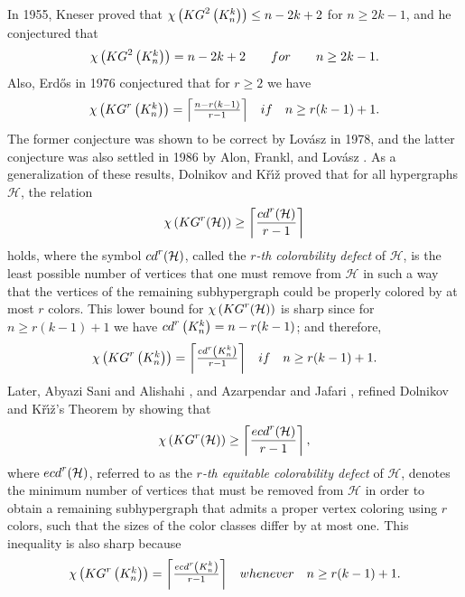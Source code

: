 \documentclass[11pt]{amsart}
\theoremstyle{definition}
\begin{document}
\noindent In 1955, Kneser \cite{MR0068536} proved that $\chi\left({\rm KG}^2 \left(  K_n^k \right) \right) \leq n-2k+2$ for $n\geq 2k-1$, and he conjectured that 
$$\begin{array}{lcccr}
	\chi\left({\rm KG}^2 \left(  K_n^k \right) \right) = n-2k+2  &    &  {\rm for }  &   &   n\geq 2k-1 .
\end{array}$$
Also, Erd\H{o}s
\cite{MR0465878} in 1976 conjectured that for $r\geq 2$ we have
$$\begin{array}{lrr}
	\chi\left({\rm KG}^r \left(  K_n^k \right) \right) = \left\lceil \frac{n-r(k-1)}{r-1} \right\rceil &  {\rm if }  &  n \geq r(k-1) + 1 .
\end{array}$$
The former conjecture was shown to be correct by Lov{\'a}sz \cite{MR514625} in 1978, and the latter conjecture was also settled in 1986
by Alon, Frankl, and Lov{\'a}sz \cite{MR857448}.
As a generalization of these results, Dol{\cprime}nikov and K{\v{r}}{\'{\i}}{\v{z}} \cite{MR953021,MR1081939,MR1665335}
proved that for all hypergraphs ${\mathcal H}$, the relation
$$\chi\left({\rm KG}^r   ({\mathcal H})  \right) \geq \left\lceil \frac{ {\rm cd}^r({\mathcal H}) }{r-1} \right\rceil $$
holds, where the symbol ${\rm cd}^r({\mathcal H})$, called the {\it $r$-th colorability defect} of ${\mathcal H}$, is the least possible number of vertices that one must remove from
${\mathcal H}$ in such a way that the vertices of the remaining subhypergraph could be properly colored by at most $r$ colors. This lower bound for
$\chi\left({\rm KG}^r   ({\mathcal H})  \right) $ is sharp since for
$n \geq r(k-1) + 1$ we have
${\rm cd}^r \left(  K_n^k \right) = n-r(k-1)$; and therefore,
$$\begin{array}{lrr}
	\chi\left({\rm KG}^r \left(  K_n^k \right) \right) = \left\lceil \frac{{\rm cd}^r \left(  K_n^k \right)}{r-1} \right\rceil &  {\rm if }  &  n \geq r(k-1) + 1 .
\end{array}$$
Later, Abyazi Sani and Alishahi \cite{ABYAZISANI2018229}, and Azarpendar and Jafari \cite{AZARPENDAR2023103664},
refined Dol{\cprime}nikov and K{\v{r}}{\'{\i}}{\v{z}}'s Theorem by showing that
$$\chi\left({\rm KG}^r ({\mathcal H}) \right) \geq \left\lceil \frac{ {\rm ecd}^r({\mathcal H}) }{r-1} \right\rceil ,$$
where ${\rm ecd}^r({\mathcal H})$, referred to as the {\it $r$-th equitable colorability defect} of ${\mathcal H}$, denotes the minimum number of vertices that must be
removed from ${\mathcal H}$ in order to obtain a remaining subhypergraph that admits a proper vertex coloring using $r$ colors, such that the sizes of the color classes differ by at most one.
This inequality is also sharp because
$$\begin{array}{lrr}
	\chi\left({\rm KG}^r \left(  K_n^k \right) \right) = \left\lceil \frac{{\rm ecd}^r \left(  K_n^k \right)}{r-1} \right\rceil &  {\rm whenever }  &  n \geq r(k-1) + 1 .
\end{array}$$
\end{document}

